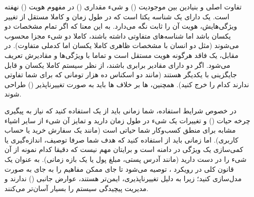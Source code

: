 تفاوت اصلی و بنیادین بین موجودیت () و شیء مقداری () در مفهوم هویت () نهفته است. یک  دارای یک شناسه یکتا است که در طول زمان و کاملا مستقل از تغییر ویژگی‌هایش، هویت آن را ثابت نگه می‌دارد. به این معنا که اگر تمام مشخصات دو  یکسان باشد اما شناسه‌های متفاوتی داشته باشند، کاملا دو شیء مجزا محسوب می‌شوند (مثل دو انسان با مشخصات ظاهری کاملا یکسان اما کدملی متفاوت). در مقابل، یک  فاقد هرگونه هویت مستقل است و تماما با ویژگی‌ها و مقادیرش تعریف می‌شود. اگر دو  دارای مقادیر برابری باشند، از نظر سیستم کاملا یکسان و قابل جایگزینی با یکدیگر هستند (مانند دو اسکناس ده هزار تومانی که برای شما تفاوتی ندارند کدام را خرج کنید). همچنین، ها بر خلاف ها باید به صورت تغییرناپذیر () طراحی شوند.

در خصوص شرایط استفاده، شما زمانی باید از یک  استفاده کنید که نیاز به پیگیری چرخه حیات () و تغییرات یک شیء در طول زمان دارید و تمایز آن شیء از سایر اشیاء مشابه برای منطق کسب‌وکار شما حیاتی است (مانند یک سفارش خرید یا حساب کاربری). اما زمانی باید از  استفاده کنید که هدف شما صرفا توصیف، اندازه‌گیری یا کمی‌سازی یک ویژگی در دامنه است و برایتان مهم نیست که دقیقا کدام نمونه از آن شیء را در دست دارید (مانند آدرس پستی، مبلغ پول یا یک بازه زمانی). به عنوان یک قانون کلی در رویکرد ، توصیه می‌شود تا جای ممکن مفاهیم را به جای  به صورت  مدل‌سازی کنید؛ زیرا به دلیل تغییرناپذیری، ایمن‌تر هستند، عوارض جانبی () ندارند و مدیریت پیچیدگی سیستم را بسیار آسان‌تر می‌کنند.
